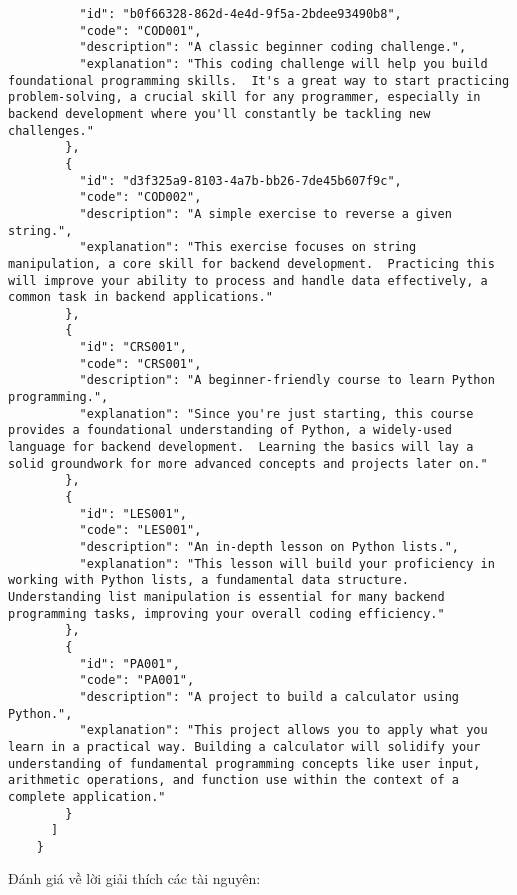 \begin{itemize}
\begin{verbatim}
          "id": "b0f66328-862d-4e4d-9f5a-2bdee93490b8",
          "code": "COD001",
          "description": "A classic beginner coding challenge.",
          "explanation": "This coding challenge will help you build foundational programming skills.  It's a great way to start practicing problem-solving, a crucial skill for any programmer, especially in backend development where you'll constantly be tackling new challenges."
        },
        {
          "id": "d3f325a9-8103-4a7b-bb26-7de45b607f9c",
          "code": "COD002",
          "description": "A simple exercise to reverse a given string.",
          "explanation": "This exercise focuses on string manipulation, a core skill for backend development.  Practicing this will improve your ability to process and handle data effectively, a common task in backend applications."
        },
        {
          "id": "CRS001",
          "code": "CRS001",
          "description": "A beginner-friendly course to learn Python programming.",
          "explanation": "Since you're just starting, this course provides a foundational understanding of Python, a widely-used language for backend development.  Learning the basics will lay a solid groundwork for more advanced concepts and projects later on."
        },
        {
          "id": "LES001",
          "code": "LES001",
          "description": "An in-depth lesson on Python lists.",
          "explanation": "This lesson will build your proficiency in working with Python lists, a fundamental data structure.  Understanding list manipulation is essential for many backend programming tasks, improving your overall coding efficiency."
        },
        {
          "id": "PA001",
          "code": "PA001",
          "description": "A project to build a calculator using Python.",
          "explanation": "This project allows you to apply what you learn in a practical way. Building a calculator will solidify your understanding of fundamental programming concepts like user input, arithmetic operations, and function use within the context of a complete application."
        }
      ]
    }
    \end{verbatim}
\end{itemize}
Đánh giá về lời giải thích các tài nguyên:
